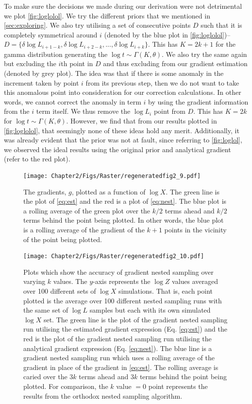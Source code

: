 To make sure the decisions we made during our derivation were not detrimental we plot \cref{fig:loglolol}. We try the different priors that we mentioned in \cref{sec:exploring}. We also try utilising a set of consecutive points $D$ such that it is completely symmetrical around $i$ (denoted by the blue plot in \cref{fig:loglolol})--$D= \{ \delta \log L_{i+1-k},\delta \log L_{i+2-k},...,\delta \log L_{i+k} \}$. This has $K=2k+1$ for the gamma distribution generating the $\log t \sim \Gamma(K,\theta)$. We also try the same again but excluding the $i$th point in $D$ and thus excluding from our gradient estimation (denoted by grey plot). The idea was that if there is some anomaly in the increment taken by point $i$ from its previous step, then we do not want to take this anomalous point into consideration for our correction calculations. In other words, we cannot correct the anomaly in term $i$ by using the gradient information from the $i$ term itself. We thus remove the $\log L_i$ point from $D$. This has $K=2k$ for $\log t \sim \Gamma(K,\theta)$. However, we find that from our results plotted in \cref{fig:loglolol}, that seemingly none of these ideas hold any merit. Additionally, it was already evident that the prior was not at fault, since referring to \cref{fig:loglol}, we observed the ideal results using the original prior and analytical gradient (refer to the red plot).


\begin{figure} 
\centering    
\texttt{[image: Chapter2/Figs/Raster/regeneratedfig2\_9.pdf]}
\caption{ The gradients, $g$, plotted as a function of $\log X$. The green line is the plot of \cref{eq:est} and the red is a plot of \cref{eq:nest}. The blue plot is a rolling average of the green plot over the $k/2$ terms ahead and $k/2$ terms behind the point being plotted. In other words, the blue plot is a rolling average of the gradient of the $k+1$ points in the vicinity of the point being plotted.}

\label{fig:fffff}
\end{figure}

\begin{figure} 
\centering    
\texttt{[image: Chapter2/Figs/Raster/regeneratedfig2\_10.pdf]}
\caption{ Plots which show the accuracy of gradient nested sampling over varying $k$ values. The $y$-axis represents the $\log Z$ values averaged over 100 different sets of $\log X$ simulations. That is, each point plotted is the average over 100 different nested sampling runs with the same set of $\log L$ samples but each with its own simulated $\log X$ set. The green line is the plot of the gradient nested sampling run utilising the estimated gradient expression (Eq. \ref{eq:est}) and the red is the plot of the gradient nested sampling run utilising the analytical gradient expression (Eq. \ref{eq:nest}). The blue line is a gradient nested sampling run which uses a rolling average of the gradient in place of the gradient in \cref{eq:est}. The rolling average is caried over the $3k$ terms ahead and $3k$ terms behind the point being plotted. For comparison, the $k$ value $=0$ point represents the results from the orthodox nested sampling algorithm.}

\label{fig:rrr}
\end{figure}

